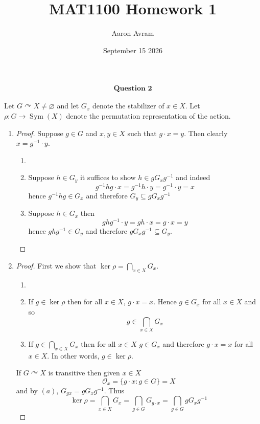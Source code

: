 \documentclass[12pt]{article}
\title{MAT1100 Homework 1}
\author{Aaron Avram}
\date{September 15 2026}
\begin{document}
\newtheorem{definition}{Definition}
\newtheorem{theorem}{Theorem}
\newtheorem{claim}{Claim}
\newtheorem{corollary}{Corollary}

\maketitle

\begin{align*}
    \textbf{Question 2}
\end{align*}

Let $G \curvearrowright X \neq \varnothing$ and let $G_x$ denote the stabilizer of $x \in X$.
Let $\rho: G \to \operatorname{Sym}(X)$ denote the permutation representation of the action.
\begin{enumerate}
    \item[(a)]
    \begin{proof}
        Suppose $g \in G$ and $x, y \in X$ such that $g \cdot x = y$. Then clearly $x = g^{-1} \cdot y$.
        \begin{enumerate}
            \item[]
            \item[($\subseteq$)] Suppose $h \in G_y$ it suffices to show $h \in gG_xg^{-1}$ and indeed
            \[ g^{-1}hg \cdot x = g^{-1}h \cdot y = g^{-1} \cdot y = x \]
            hence $g^{-1}hg \in G_x$ and therefore $G_y \subseteq gG_xg^{-1}$
            \item[($\supseteq$)] Suppose $h \in G_x$ then
            \[ ghg^{-1} \cdot y = gh \cdot x = g \cdot x = y \]
            hence $ghg^{-1} \in G_y$ and therefore $gG_xg^{-1} \subseteq G_y$.
        \end{enumerate}
    \end{proof}

    \item[(b)]
    \begin{proof}
        First we show that $\ker \rho = \bigcap_{x \in X}G_x$.
        \begin{enumerate}
            \item[]
            \item[($\subseteq$)] If $g \in \ker \rho$ then for all $x \in X$, $g \cdot x = x$.
            Hence $g \in G_x$ for all $x \in X$ and so
            \[ g \in \bigcap_{x \in X}G_x \]
            \item[($\supseteq$)] If $g \in \bigcap_{x \in X}G_x$ then for all $x \in X$
            $ g \in G_x$ and therefore $g \cdot x = x$ for all $x \in X$. In other words, $g \in \ker \rho$.
        \end{enumerate}
        If $G \curvearrowright X$ is transitive then given $x \in X$
        \[ \mathcal O_x = \{ g \cdot x : g \in G \} = X \]
        and by $(a)$, $G_{gx} = gG_x g^{-1}$. Thus
        \[ \ker \rho = \bigcap_{x \in X}G_x = \bigcap_{g \in G}G_{g \cdot x} = \bigcap_{g \in G}gG_xg^{-1} \]
    \end{proof}


\end{enumerate}
\end{document}
